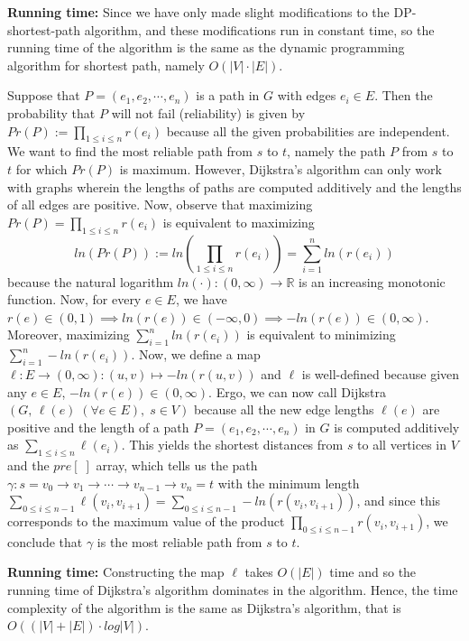 \documentclass[tikz, letterpaper,12pt]{article}
\newcommand{\RR}{\mathbb{R}}
\newcounter{problemid}\stepcounter{problemid}
\def\newproblem{\vspace*{0.01cm}{\bf Problem~\arabic{problemid}\stepcounter{problemid}}\hfill\fbox{\parbox{0.16\textwidth}{\bf Points:}}\par}
\begin{document}
\textbf{Running time:} Since we have only made slight modifications to the DP-shortest-path algorithm, and these modifications run in constant time, so the running time of the algorithm is the same as the dynamic programming algorithm for shortest path, namely $O(|V|\cdot|E|)$.

\newproblem
Suppose that $P=(e_1,e_2,\cdots,e_n)$ is a path in $G$ with edges $e_i\in E$. Then the probability that $P$ will not fail (reliability) is given by $Pr(P):=\prod_{1\leq i\leq n} r(e_i)$ because all the given probabilities are independent. We want to find the most reliable path from $s$ to $t$, namely the path $P$ from $s$ to $t$ for which $Pr(P)$ is maximum. 
However, Dijkstra's algorithm can only work with graphs wherein the lengths of paths are computed additively and the lengths of all edges are positive. 
Now, observe that maximizing $Pr(P)=\prod_{1\leq i\leq n} r(e_i)$ is equivalent to maximizing $$ln(Pr(P)):=ln\left(\prod_{1\leq i\leq n} r(e_i)\right)=\sum_{i=1}^n ln(r(e_i))$$ because the natural logarithm $ln(\cdot)\colon (0,\infty)\to\RR$ is an increasing monotonic function. 
Now, for every $e\in E$, we have $r(e)\in(0,1)\implies ln(r(e))\in (-\infty, 0)\implies -ln(r(e))\in (0, \infty)$. 
Moreover, maximizing $\sum_{i=1}^n ln(r(e_i))$ is equivalent to minimizing $\sum_{i=1}^n -ln(r(e_i))$. Now, we define a map $\ell\colon E\to (0,\infty)\colon (u,v)\mapsto -ln(r(u,v))$ and $\ell$ is well-defined because given any $e\in E$, $-ln(r(e))\in(0,\infty)$. Ergo, we can now call Dijkstra$(G,\,\ell(e)\;(\forall e\in E),\; s\in V)$ because all the new edge lengths $\ell(e)$ are positive and the length of a path $P=(e_1,e_2,\cdots,e_n)$ in $G$ is computed additively as $\sum_{1\leq i\leq n} \ell(e_i)$. 
This yields the shortest distances from $s$ to all vertices in $V$ and the $pre[\;]$ array, which tells us the path $\gamma:s=v_0\to v_1\to\cdots\to v_{n-1}\to v_n=t$ with the minimum length $\sum_{0\leq i\leq n-1} \ell(v_i,v_{i+1})=\sum_{0\leq i\leq n-1} -ln(r(v_i,v_{i+1}))$, and since this corresponds to the maximum value of the product $\prod_{0\leq i\leq n-1} r(v_i,v_{i+1})$, we conclude that $\gamma$ is the most reliable path from $s$ to $t$.

\textbf{Running time:} Constructing the map $\ell$ takes $O(|E|)$ time and so the running time of Dijkstra's algorithm dominates in the algorithm. Hence, the time complexity of the algorithm is the same as Dijkstra's algorithm, that is $O((|V|+|E|)\cdot log|V|)$.
\end{document}

